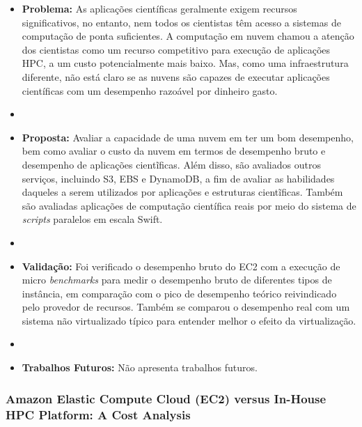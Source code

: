 \documentclass[tese,capa]{texufpel}
\begin{document}
\begin{itemize}[label={},noitemsep]
  \item \textbf{Problema:} As aplicações científicas geralmente exigem recursos significativos, no entanto, nem todos os cientistas têm acesso a sistemas de computação de ponta suficientes. A computação em nuvem chamou a atenção dos cientistas como um recurso competitivo para execução de aplicações HPC, a um custo potencialmente mais baixo. Mas, como uma infraestrutura diferente, não está claro se as nuvens são capazes de executar aplicações científicas com um desempenho razoável por dinheiro gasto.
  \item 
  \item \textbf{Proposta:} Avaliar a capacidade de uma nuvem em ter um bom desempenho, bem como avaliar o custo da nuvem em termos de desempenho bruto e desempenho de aplicações cientĩficas. Além disso, são avaliados outros serviços, incluindo S3, EBS e DynamoDB, a fim de avaliar as habilidades daqueles a serem utilizados por aplicações e estruturas cientĩficas. Também são avaliadas aplicações de computação científica reais por meio do sistema de \textit{scripts} paralelos em escala Swift.
  \item 
  \item \textbf{Validação:} Foi verificado o desempenho bruto do EC2 com a execução de micro \textit{benchmarks} para medir o desempenho bruto de diferentes tipos de instância, em comparação com o pico de desempenho teórico reivindicado pelo provedor de recursos. Também se comparou o desempenho real com um sistema não virtualizado típico para entender melhor o efeito da virtualização.
  \item
  \item \textbf{Trabalhos Futuros:} Não apresenta trabalhos futuros. 
\end{itemize}

\subsubsection{Amazon Elastic Compute Cloud (EC2) versus In-House HPC Platform: A Cost Analysis \cite{emerasAmazonElasticCompute2019c}}
\end{document}
